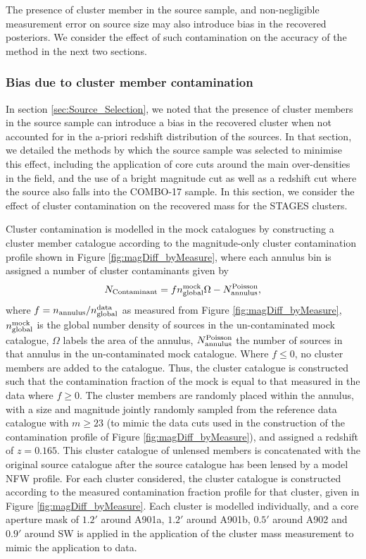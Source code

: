 \documentclass[useAMS,usenatbib,times,letter,amssymb]{mn2e}
\def\be{\begin{equation}}
\def\ee{\end{equation}}
\begin{document}
The presence of cluster member in the source sample, and non-negligible measurement error on source size may also introduce bias in the recovered posteriors. We consider the effect of such contamination on the accuracy of the method in the next two sections.

\subsubsection{Bias due to cluster member contamination}

In section \ref{sec:Source_Selection}, we noted that the presence of cluster members in the source sample can introduce a bias in the recovered cluster when not accounted for in the a-priori redshift distribution of the sources. In that section, we detailed the methods by which the source sample was selected to minimise this effect, including the application of core cuts around the main over-densities in the field, and the use of a bright magnitude cut as well as a redshift cut where the source also falls into the COMBO-17 sample. In this section, we consider the effect of cluster contamination on the recovered mass for the STAGES clusters.

Cluster contamination is modelled in the mock catalogues by constructing a cluster member catalogue according to the magnitude-only cluster contamination profile shown in Figure \ref{fig:magDiff_byMeasure}, where each annulus bin is assigned a number of cluster contaminants given by 
\be
N_{\rm Contaminant} = fn^{\rm mock}_{\rm global}\Omega - N_{\rm annulus}^{\rm Poisson},
\ee
where $f = n_{\rm annulus}/n_{\rm global}^{\rm data}$ as measured from Figure \ref{fig:magDiff_byMeasure}, $n^{\rm mock}_{\rm global}$ is the global number density of sources in the un-contaminated mock catalogue, $\Omega$ labels the area of the annulus, $N_{\rm annulus}^{\rm Poisson}$ the number of sources in that annulus in the un-contaminated mock catalogue. Where $f\le 0$, no cluster members are added to the catalogue. Thus, the cluster catalogue is constructed such that the contamination fraction of the mock is equal to that measured in the data where $f\ge 0$. The cluster members are randomly placed within the annulus, with a size and magnitude jointly randomly sampled from the reference data catalogue with $m\ge 23$ (to mimic the data cuts used in the construction of the contamination profile of Figure \ref{fig:magDiff_byMeasure}), and assigned a redshift of $z = 0.165$.  This cluster catalogue of unlensed members is concatenated with the original source catalogue after the source catalogue has been lensed by a model NFW profile. For each cluster considered, the cluster catalogue is constructed according to the measured contamination fraction profile for that cluster, given in Figure \ref{fig:magDiff_byMeasure}. Each cluster is modelled individually, and a core aperture mask of $1.2'$ around A901a, $1.2'$ around A901b, $0.5'$ around A902 and $0.9'$ around SW is applied in the application of the cluster mass measurement to mimic the application to data. %
\end{document}
